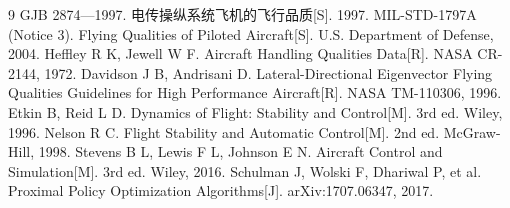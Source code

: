 \documentclass[UTF8,a4paper,11pt,fontset=fandol,scheme=plain]{ctexart}
\begin{document}
\begin{thebibliography}{9}
\small
{} GJB 2874—1997. 电传操纵系统飞机的飞行品质[S]. 1997.
 MIL-STD-1797A (Notice 3). Flying Qualities of Piloted Aircraft[S]. U.S. Department of Defense, 2004.
 Heffley R K, Jewell W F. Aircraft Handling Qualities Data[R]. NASA CR-2144, 1972.
 Davidson J B, Andrisani D. Lateral-Directional Eigenvector Flying Qualities Guidelines for High Performance Aircraft[R]. NASA TM-110306, 1996.
 Etkin B, Reid L D. Dynamics of Flight: Stability and Control[M]. 3rd ed. Wiley, 1996.
 Nelson R C. Flight Stability and Automatic Control[M]. 2nd ed. McGraw-Hill, 1998.
 Stevens B L, Lewis F L, Johnson E N. Aircraft Control and Simulation[M]. 3rd ed. Wiley, 2016.
 Schulman J, Wolski F, Dhariwal P, et al. Proximal Policy Optimization Algorithms[J]. arXiv:1707.06347, 2017.
\end{thebibliography}
\end{document}

